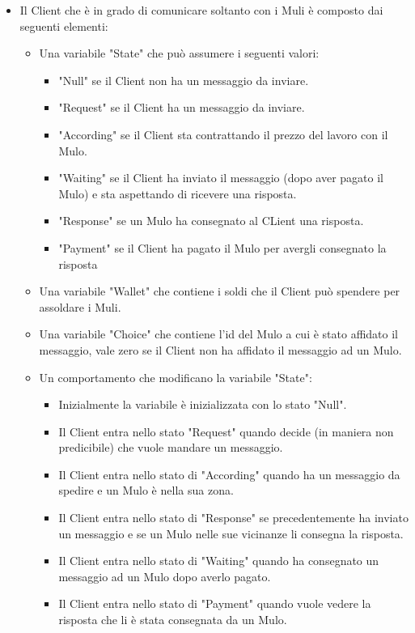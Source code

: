 \documentclass[13pt,a4paper]{article}
\begin{document}
	\begin{itemize}
		\item Il Client che è in grado di comunicare soltanto con i Muli è composto dai seguenti elementi:
				  \begin{itemize}
					\item Una variabile "State" che può assumere i seguenti valori:
							\begin{itemize}
								\item "Null" se il Client non ha un messaggio da inviare.
								\item "Request" se il Client ha un messaggio da inviare.
								\item "According" se il Client sta contrattando il prezzo del lavoro con il Mulo.
								\item "Waiting" se il Client ha inviato il messaggio (dopo aver pagato il Mulo) e sta aspettando di ricevere una risposta.
								\item "Response" se un Mulo ha consegnato al CLient una risposta.
								\item "Payment" se il Client ha pagato il Mulo per avergli consegnato la risposta
							\end{itemize}
						\item Una variabile "Wallet" che contiene i soldi che il Client può spendere per assoldare i Muli.
						\item Una variabile "Choice" che contiene l'id del Mulo a cui è stato affidato il messaggio, vale zero se il Client non ha  affidato il messaggio ad un Mulo.
						\item Un comportamento che modificano la variabile "State":
						\begin{itemize}
							\item Inizialmente la variabile è inizializzata con lo stato "Null".
							\item Il Client entra nello stato "Request" quando decide (in maniera non predicibile) che vuole mandare un messaggio.
							\item Il Client entra nello stato di "According" quando ha un messaggio da spedire e un Mulo è nella sua zona.
							\item Il Client entra nello stato di "Response" se precedentemente ha inviato un messaggio e se un Mulo nelle sue vicinanze li consegna la risposta.
							\item Il Client entra nello stato di "Waiting" quando ha consegnato un messaggio ad un Mulo dopo averlo pagato. 
							\item Il Client entra nello stato di "Payment" quando vuole vedere la risposta che li è stata consegnata da un Mulo.

\end{itemize}
\end{itemize}
\end{itemize}
\end{document}
